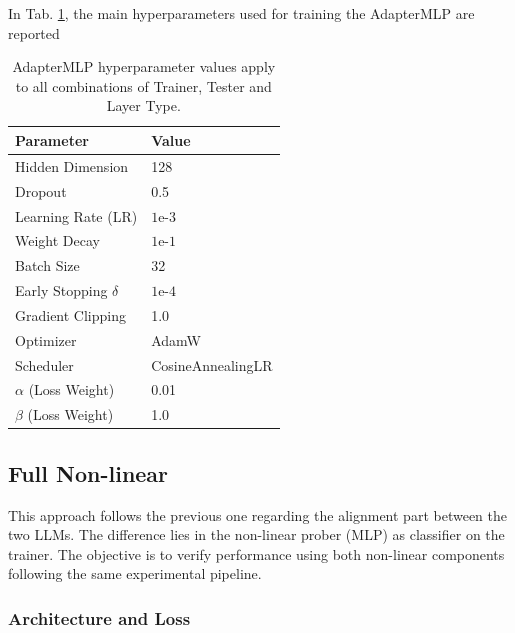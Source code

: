 In Tab. \ref{tab:hyperparameters-common}, the main hyperparameters used for training the AdapterMLP are reported

\begin{table}[H]
\centering
\begin{tabularx}{\textwidth}{Xl}
    \toprule
    \textbf{Parameter} & \textbf{Value} \\
    \midrule
    Hidden Dimension & 128 \\
    Dropout & 0.5 \\
    Learning Rate (LR) & $1\text{e-}3$ \\
    Weight Decay & $1\text{e-}1$ \\
    Batch Size & 32 \\
    Early Stopping $\delta$ & $1\text{e-}4$ \\
    Gradient Clipping & 1.0 \\
    Optimizer & AdamW \\
    Scheduler & CosineAnnealingLR \\
    $\alpha$ (Loss Weight) & 0.01 \\
    $\beta$ (Loss Weight) & 1.0 \\
    \bottomrule
\end{tabularx}
\caption{AdapterMLP hyperparameter values apply to all combinations of Trainer, Tester and Layer Type.}
\label{tab:hyperparameters-common}
\end{table}

\subsection{Full Non-linear}
This approach follows the previous one regarding the alignment part between the two LLMs. The difference lies in the non-linear prober (MLP) as classifier on the trainer. The objective is to verify performance using both non-linear components following the same experimental pipeline.

\subsubsection{Architecture and Loss}



